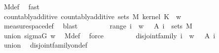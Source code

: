 \begin{isabellebody}
\ M{}{\isacharunderscore}{\kern0pt}def\ \isamarkupfalse%
\ fast\isanewline
\ \ \ \ \ \ \isamarkupfalse%
\ \isamarkupfalse%
\ countably{\isacharunderscore}{\kern0pt}additive{\isacharcolon}{\kern0pt}\ {\isachardoublequoteopen}countably{\isacharunderscore}{\kern0pt}additive\ {\isacharparenleft}{\kern0pt}sets\ M{}{\isacharparenright}{\kern0pt}\ {\isacharparenleft}{\kern0pt}kernel\ K\ {\isacharparenleft}{\kern0pt}{\isasymomega}\ w{\isacharparenright}{\kern0pt}{\isacharparenright}{\kern0pt}{\isachardoublequoteclose}\isanewline
\ \ \ \ \ \ \ \ \isamarkupfalse%
\ measure{\isacharunderscore}{\kern0pt}space{\isacharunderscore}{\kern0pt}def\ \isamarkupfalse%
\ blast\isanewline
\ \ \ \ \ \ \isamarkupfalse%
\ {}{\isacharcolon}{\kern0pt}\ {\isachardoublequoteopen}range\ {\isacharparenleft}{\kern0pt}{\isasymlambda}i{\isachardot}{\kern0pt}\ {\isacharbraceleft}{\kern0pt}{\isasymomega}\ {\isacharparenleft}{\kern0pt}w{\isacharcomma}{\kern0pt}\ {\isasymomega}\ {\isasymin}\ A\ i{\isacharbraceright}{\kern0pt}{\isacharparenright}{\kern0pt}\ {\isasymsubseteq}\ sets\ M{}{\isachardoublequoteclose}\isanewline
\ \ \ \ \ \ \ \ \isamarkupfalse%
\ union{\isacharparenleft}{\kern0pt}{}{\isacharparenright}{\kern0pt}\ sigma{\isacharunderscore}{\kern0pt}G\ w\ \isamarkupfalse%
\ M{}{\isacharunderscore}{\kern0pt}def\ \isamarkupfalse%
\ force\isanewline
\ \ \ \ \ \ \isamarkupfalse%
\ {}{\isacharcolon}{\kern0pt}\ {\isachardoublequoteopen}disjoint{\isacharunderscore}{\kern0pt}family\ {\isacharparenleft}{\kern0pt}{\isasymlambda}i{\isachardot}{\kern0pt}\ {\isacharbraceleft}{\kern0pt}{\isasymomega}\ {\isacharparenleft}{\kern0pt}w{\isacharcomma}{\kern0pt}\ {\isasymomega}\ {\isasymin}\ A\ i{\isacharbraceright}{\kern0pt}{\isacharparenright}{\kern0pt}{\isachardoublequoteclose}\isanewline
\ \ \ \ \ \ \ \ \isamarkupfalse%
\ union{\isacharparenleft}{\kern0pt}{}{\isacharparenright}{\kern0pt}\ \isamarkupfalse%
\ disjoint{\isacharunderscore}{\kern0pt}family{\isacharunderscore}{\kern0pt}on{\isacharunderscore}{\kern0pt}def\ \isamarkupfalse%

\end{isabellebody}
